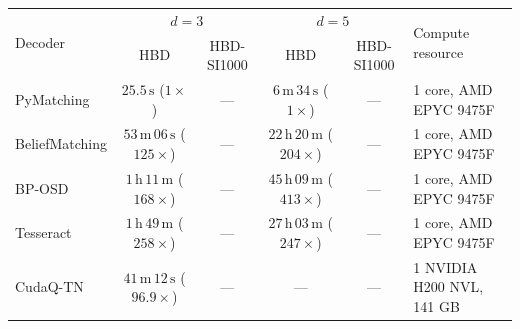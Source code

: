 \begin{tabular}{l|cc|cc|l}
    \multirow{2}{*}{Decoder} & \multicolumn{2}{c|}{$d = 3$} & \multicolumn{2}{c|}{$d = 5$} & \multirow{2}{*}{Compute resource} \\
     & HBD & HBD-SI1000 & HBD & HBD-SI1000 &  \\
    \hline
    PyMatching & $25.5\,\mathrm{s}$ ($1\times$) & --- & $6\,\mathrm{m}\,34\,\mathrm{s}$ ($1\times$) & --- & 1 core, AMD EPYC 9475F \\
    BeliefMatching & $53\,\mathrm{m}\,06\,\mathrm{s}$ ($125\times$) & --- & $22\,\mathrm{h}\,20\,\mathrm{m}$ ($204\times$) & --- & 1 core, AMD EPYC 9475F \\
    BP-OSD & $1\,\mathrm{h}\,11\,\mathrm{m}$ ($168\times$) & --- & $45\,\mathrm{h}\,09\,\mathrm{m}$ ($413\times$) & --- & 1 core, AMD EPYC 9475F \\
    Tesseract & $1\,\mathrm{h}\,49\,\mathrm{m}$ ($258\times$) & --- & $27\,\mathrm{h}\,03\,\mathrm{m}$ ($247\times$) & --- & 1 core, AMD EPYC 9475F \\
    CudaQ-TN & $41\,\mathrm{m}\,12\,\mathrm{s}$ ($96.9\times$) & --- & --- & --- & 1 NVIDIA H200 NVL, 141 GB \\
\end{tabular}